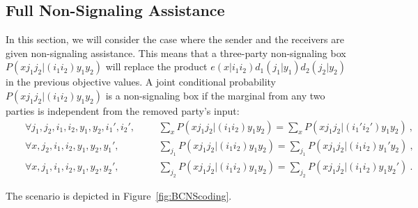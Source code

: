 \subsection{Full Non-Signaling Assistance}
In this section, we will consider the case where the sender and the receivers are given non-signaling assistance. This means that a three-party non-signaling box $P(xj_1j_2|(i_1i_2)y_1y_2)$ will replace the product $e(x|i_1i_2)d_1(j_1|y_1)d_2(j_2|y_2)$ in the previous objective values. A joint conditional probability $P(xj_1j_2|(i_1i_2)y_1y_2)$ is a non-signaling box if the marginal from any two parties is independent from the removed party's input:
\begin{equation}
  \begin{aligned}
    &&\forall j_1,j_2,i_1,i_2,y_1,y_2,i_1',i_2', &&&\sum_{x} P(xj_1j_2|(i_1i_2)y_1y_2) = \sum_{x} P(xj_1j_2|(i_1'i_2')y_1y_2) \ ,\\
    &&\forall x,j_2,i_1,i_2,y_1,y_2,y_1', &&&\sum_{j_1} P(xj_1j_2|(i_1i_2)y_1y_2) = \sum_{j_1} P(xj_1j_2|(i_1i_2)y_1'y_2) \ ,\\
    &&\forall x,j_1,i_1,i_2,y_1,y_2,y_2', &&&\sum_{j_2} P(xj_1j_2|(i_1i_2)y_1y_2) = \sum_{j_2} P(xj_1j_2|(i_1i_2)y_1y_2') \ .
  \end{aligned}
\end{equation}

The scenario is depicted in Figure~\ref{fig:BCNScoding}.

